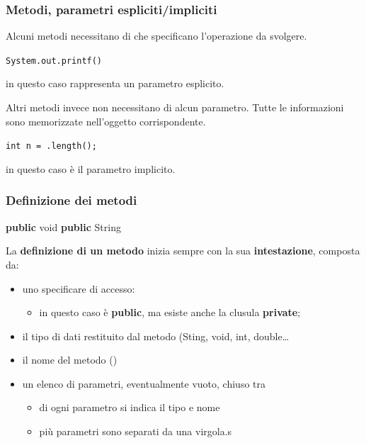 \begin{frame}
\frametitle{Metodi, parametri espliciti/impliciti}
\begin{block}{}
Alcuni metodi necessitano di  che specificano l'operazione da svolgere.
\begin{center}
\texttt{System.out.printf()}
\end{center}
 in questo caso rappresenta un parametro esplicito.
\end{block}
\begin{block}{}
Altri metodi invece non necessitano di alcun parametro. Tutte le informazioni sono memorizzate nell'oggetto corrispondente.
\begin{center}
\texttt{int n = .length();}
\end{center}
 in questo caso è il parametro implicito.
\end{block}
\end{frame}

\begin{frame}
\frametitle{Definizione dei metodi}
\begin{block}{}
\textbf{public} \alert{void} 
\textbf{public} \alert{String} 
\end{block}
\begin{block}{}
La \textbf{definizione di un metodo} inizia sempre con la sua \textbf{intestazione}, composta da:
\begin{itemize}
\item uno specificare di accesso:
\begin{itemize}
\item in questo caso è \textbf{public}, ma esiste anche la clusula \textbf{private};
\end{itemize}
\item il tipo di dati restituito dal metodo (\alert{Sting, void, int, double\ldots}
\item il nome del metodo ()
\item un elenco di parametri, eventualmente vuoto, chiuso tra 
\begin{itemize}
\item di ogni parametro si indica il tipo e nome
\item più parametri sono separati da una virgola.s
\end{itemize}
\end{itemize}
\end{block}
\end{frame}

